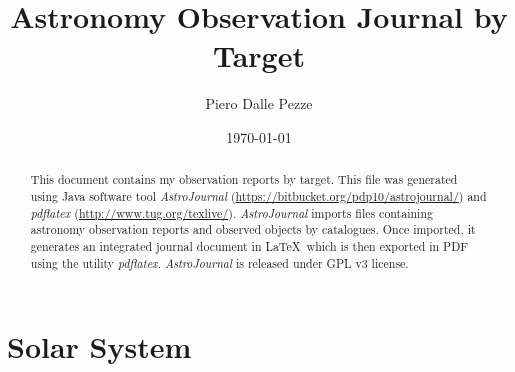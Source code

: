 \documentclass[10pt,twoside,a4paper,english]{article}
\title{Astronomy Observation Journal by Target}
\author{Piero Dalle Pezze}
\date{\today}
\begin{document}
 
 
\maketitle 
\thispagestyle{empty} 
 
\begin{abstract} 
This document contains my observation reports by target. This file was generated using Java software tool {\it AstroJournal} (\href{https://bitbucket.org/pdp10/astrojournal/}{https://bitbucket.org/pdp10/astrojournal/}) and {\it pdflatex} (\href{http://www.tug.org/texlive/}{http://www.tug.org/texlive/}). {\it AstroJournal} imports files containing astronomy observation reports and observed objects by catalogues. Once imported, it generates an integrated journal document in \LaTeX\ which is then exported in PDF using the utility {\it pdflatex}. {\it AstroJournal} is released under GPL v3 license. 
\end{abstract} 
 
\tableofcontents 
 
 
\clearpage 
 
 
\small 
 
\clearpage 
 
 
\normalsize 
\clearpage
\section{Solar System}

\vspace{4 mm}

\vspace{4 mm}

\vspace{4 mm}

\vspace{4 mm}

\vspace{4 mm}

\vspace{4 mm}

\vspace{4 mm}

\vspace{4 mm}

\vspace{4 mm}
\clearpage
\end{document}
